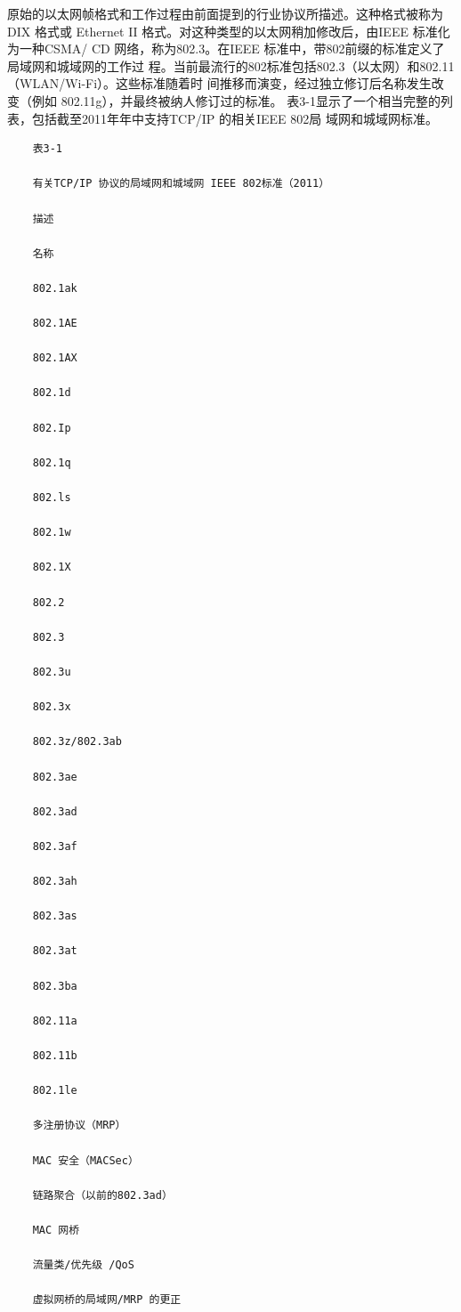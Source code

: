 原始的以太网帧格式和工作过程由前面提到的行业协议所描述。这种格式被称为DIX
格式或 Ethernet II 格式。对这种类型的以太网稍加修改后，由IEEE 标准化为一种CSMA/
CD 网络，称为802.3。在IEEE 标准中，带802前缀的标准定义了局域网和城域网的工作过
程。当前最流行的802标准包括802.3（以太网）和802.11（WLAN/Wi-Fi）。这些标准随着时
间推移而演变，经过独立修订后名称发生改变（例如 802.11g），并最终被纳人修订过的标准。
表3-1显示了一个相当完整的列表，包括截至2011年年中支持TCP/IP 的相关IEEE 802局
域网和城域网标准。

\begin{verbatim}
    表3-1
    
    有关TCP/IP 协议的局域网和城域网 IEEE 802标准（2011）
    
    描述
    
    名称
    
    802.1ak
    
    802.1AE
    
    802.1AX
    
    802.1d
    
    802.Ip
    
    802.1q
    
    802.ls
    
    802.1w
    
    802.1X
    
    802.2
    
    802.3
    
    802.3u
    
    802.3x
    
    802.3z/802.3ab
    
    802.3ae
    
    802.3ad
    
    802.3af
    
    802.3ah
    
    802.3as
    
    802.3at
    
    802.3ba
    
    802.11a
    
    802.11b
    
    802.1le
    
    多注册协议（MRP）
    
    MAC 安全（MACSec）
    
    链路聚合（以前的802.3ad）
    
    MAC 网桥
    
    流量类/优先级 /QoS
    
    虚拟网桥的局域网/MRP 的更正
    

\end{verbatim}
